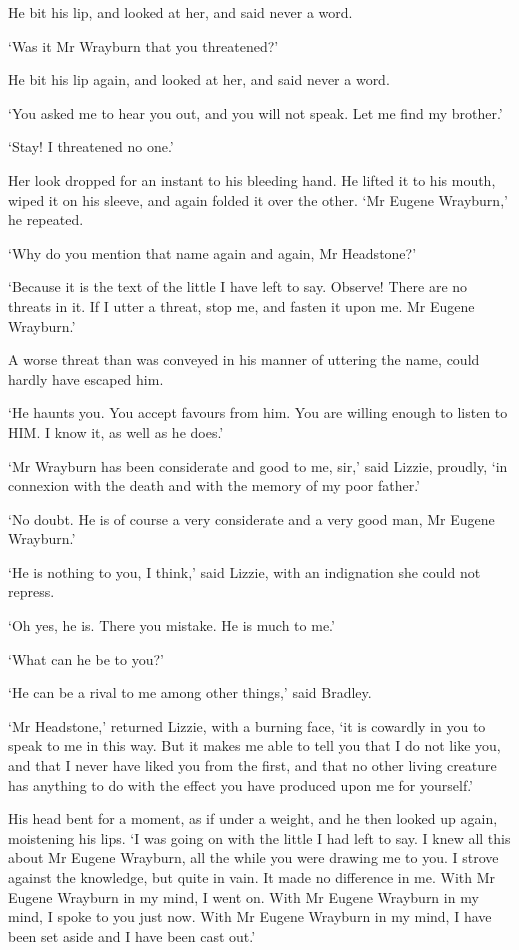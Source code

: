 He bit his lip, and looked at her, and said never a word.

‘Was it Mr Wrayburn that you threatened?’

He bit his lip again, and looked at her, and said never a word.

‘You asked me to hear you out, and you will not speak. Let me find my
brother.’

‘Stay! I threatened no one.’

Her look dropped for an instant to his bleeding hand. He lifted it to
his mouth, wiped it on his sleeve, and again folded it over the other.
‘Mr Eugene Wrayburn,’ he repeated.

‘Why do you mention that name again and again, Mr Headstone?’

‘Because it is the text of the little I have left to say. Observe! There
are no threats in it. If I utter a threat, stop me, and fasten it upon
me. Mr Eugene Wrayburn.’

A worse threat than was conveyed in his manner of uttering the name,
could hardly have escaped him.

‘He haunts you. You accept favours from him. You are willing enough to
listen to HIM. I know it, as well as he does.’

‘Mr Wrayburn has been considerate and good to me, sir,’ said Lizzie,
proudly, ‘in connexion with the death and with the memory of my poor
father.’

‘No doubt. He is of course a very considerate and a very good man, Mr
Eugene Wrayburn.’

‘He is nothing to you, I think,’ said Lizzie, with an indignation she
could not repress.

‘Oh yes, he is. There you mistake. He is much to me.’

‘What can he be to you?’

‘He can be a rival to me among other things,’ said Bradley.

‘Mr Headstone,’ returned Lizzie, with a burning face, ‘it is cowardly in
you to speak to me in this way. But it makes me able to tell you that
I do not like you, and that I never have liked you from the first, and
that no other living creature has anything to do with the effect you
have produced upon me for yourself.’

His head bent for a moment, as if under a weight, and he then looked up
again, moistening his lips. ‘I was going on with the little I had left
to say. I knew all this about Mr Eugene Wrayburn, all the while you were
drawing me to you. I strove against the knowledge, but quite in vain. It
made no difference in me. With Mr Eugene Wrayburn in my mind, I went
on. With Mr Eugene Wrayburn in my mind, I spoke to you just now. With Mr
Eugene Wrayburn in my mind, I have been set aside and I have been cast
out.’

